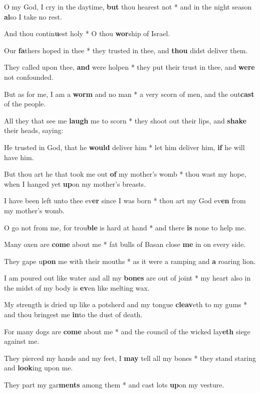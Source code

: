 \begin{multicols}{2}
	O my God, I cry in the daytime, \textbf{but} thou hearest not * and in the night season \textbf{al}so I take no rest.
	
	And thou contin\textbf{u}est holy * O thou \textbf{wor}ship of Israel.
	
	Our \textbf{fa}thers hoped in thee * they trusted in thee, and \textbf{thou} didst deliver them.
	
	They called upon thee, \textbf{and} were holpen * they put their trust in thee, and \textbf{were} not confounded.
	
	But as for me, I am a \textbf{worm} and no man * a very scorn of men, and the out\textbf{cast} of the people.
	
	All they that see me \textbf{laugh} me to scorn * they shoot out their lips, and \textbf{shake} their heads, saying:
	
	He trusted in God, that he \textbf{would} deliver him * let him deliver him, \textbf{if} he will have him.
	
	But thou art he that took me out \textbf{of} my mother's womb * thou wast my hope, when I hanged yet \textbf{up}on my mother's breasts.
	
	I have been left unto thee ev\textbf{er} since I was born * thou art my God ev\textbf{en} from my mother's womb.
	
	O go not from me, for trou\textbf{ble} is hard at hand * and there \textbf{is} none to help me.
	
	Many oxen are \textbf{come} about me * fat bulls of Basan close \textbf{me} in on every side.
	
	They gape u\textbf{pon} me with their mouths * as it were a ramping and \textbf{a} roaring lion.
	
	I am poured out like water and all my \textbf{bones} are out of joint * my heart also in the midst of my body is \textbf{ev}en like melting wax.
	
	My strength is dried up like a potsherd and my tongue \textbf{cleav}eth to my gums * and thou bringest me \textbf{in}to the dust of death.
	
	For many dogs are \textbf{come} about me * and the council of the wicked lay\textbf{eth} siege against me.
	
	They pierced my hands and my feet, I \textbf{may} tell all my bones * they stand staring and \textbf{look}ing upon me.
	
	They part my gar\textbf{ments} among them * and cast lots \textbf{up}on my vesture.
	

\end{multicols}
